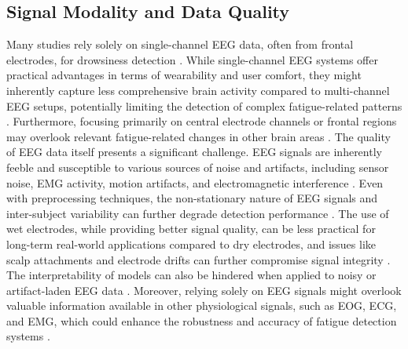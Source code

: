 \subsection{Signal Modality and Data Quality}
Many studies rely solely on single-channel EEG data, often from frontal electrodes, for drowsiness detection \citep{Bajaj_S_2022, Chinara_V_2021_2, Cui_J_2021, Ding_S_2019, Elidrissi_M_2023, Mishra_C_2024, Mitsukura_M_2018, Yang_H_2024_1}. While single-channel EEG systems offer practical advantages in terms of wearability and user comfort, they might inherently capture less comprehensive brain activity compared to multi-channel EEG setups, potentially limiting the detection of complex fatigue-related patterns \citep{Bajaj_S_2022, Ding_S_2019, Mishra_C_2024, Mitsukura_M_2018, Yang_H_2024_1, Cui_J_2021}.  Furthermore, focusing primarily on central electrode channels or frontal regions may overlook relevant fatigue-related changes in other brain areas \citep{Rahman_F_2024, Tang_J_2024, Zuraida_R_2019}.  The quality of EEG data itself presents a significant challenge. EEG signals are inherently feeble and susceptible to various sources of noise and artifacts, including sensor noise, EMG activity, motion artifacts, and electromagnetic interference \citep{Cui_J_2023_1, Majumder_S_2019, Wang_F_2018, Wang_F_2023, Wang_F_2023_1, Ghadami_A_2022, Feng_X_2025, Wang_F_2018}. Even with preprocessing techniques, the non-stationary nature of EEG signals and inter-subject variability can further degrade detection performance \citep{Chen_C_2023, Dimitrakopoulos_G_2018, Dong_N_2019, Ghadami_A_2022, Paulo_J_2021, Zhuang_Z_2024, Liu_Y_2016, Majumder_S_2019}.  The use of wet electrodes, while providing better signal quality, can be less practical for long-term real-world applications compared to dry electrodes, and issues like scalp attachments and electrode drifts can further compromise signal integrity \citep{Kartsch_V_2018, Peivandi_M_2023, Sheykhivand_S_2022_1, Wang_F_2018, Shahbakhti_M_2022}.  The interpretability of models can also be hindered when applied to noisy or artifact-laden EEG data \citep{Cui_J_2023_1, Zhang_M_2022, Zhuang_Z_2024}.  Moreover, relying solely on EEG signals might overlook valuable information available in other physiological signals, such as EOG, ECG, and EMG, which could enhance the robustness and accuracy of fatigue detection systems \citep{Tang_J_2024, Wang_F_2024_3, Wang_F_2022_1}.

